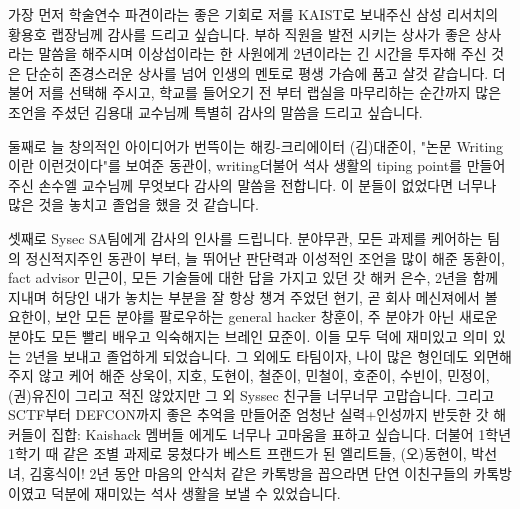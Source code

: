 \documentclass[master,english,final,pdfdoc]{kaist-ucs-improved}
\begin{document}
		
		
		
		
		
		
		
		




{\footnotesize
	
}


\iffinal
	\acknowledgment[4]
	가장 먼저 학술연수 파견이라는 좋은 기회로 저를 KAIST로 보내주신 삼성 리서치의 황용호 랩장님께 감사를 드리고 싶습니다. 부하 직원을 발전 시키는 상사가 좋은 상사라는 말씀을 해주시며 이상섭이라는 한 사원에게 2년이라는 긴 시간을 투자해 주신 것은 단순히 존경스러운 상사를 넘어 인생의 멘토로 평생 가슴에 품고 살것 같습니다. 
	더불어 저를 선택해 주시고, 학교를 들어오기 전 부터 랩실을 마무리하는 순간까지 많은 조언을 주셨던 김용대 교수님께 특별히 감사의 말씀을 드리고 싶습니다. 
	
	둘째로 늘 창의적인 아이디어가 번뜩이는 해킹-크리에이터 (김)대준이, "논문 Writing이란 이런것이다"를 보여준 동관이, writing더불어 석사 생활의 tiping point를 만들어주신 손수엘 교수님께 무엇보다 감사의 말씀을 전합니다. 이 분들이 없었다면 너무나 많은 것을 놓치고 졸업을 했을 것 같습니다. 

	셋째로 Sysec SA팀에게 감사의 인사를 드립니다. 분야무관, 모든 과제를 케어하는 팀의 정신적지주인 동관이 부터, 늘 뛰어난 판단력과 이성적인 조언을 많이 해준 동환이, fact advisor 민근이, 모든 기술들에 대한 답을 가지고 있던 갓 해커 은수, 2년을 함께 지내며 허당인 내가 놓치는 부분을 잘 항상 챙겨 주었던 현기, 곧 회사 메신져에서 볼 요한이, 보안 모든 분야를 팔로우하는 general hacker 창훈이, 주 분야가 아닌 새로운 분야도 모든 빨리 배우고 익숙해지는 브레인 묘준이. 이들 모두 덕에 재미있고 의미 있는 2년을 보내고 졸업하게 되었습니다. 
	그 외에도 타팀이자, 나이 많은 형인데도 외면해 주지 않고 케어 해준 상욱이, 지호, 도현이, 철준이, 민철이, 호준이, 수빈이, 민정이, (권)유진이 그리고 적진 않았지만 그 외 Syssec 친구들 너무너무 고맙습니다.
	그리고 SCTF부터 DEFCON까지 좋은 추억을 만들어준 엄청난 실력+인성까지 반듯한 갓 해커들이 집합: Kaishack 멤버들 에게도 너무나 고마움을 표하고 싶습니다.
	더불어 1학년 1학기 때 같은 조별 과제로 뭉쳤다가 베스트 프랜드가 된 엘리트들, (오)동현이, 박선녀, 김홍식이! 2년 동안 마음의 안식처 같은 카톡방을 꼽으라면 단연 이친구들의 카톡방이였고 덕분에 재미있는 석사 생활을 보낼 수 있었습니다.
\end{document}
